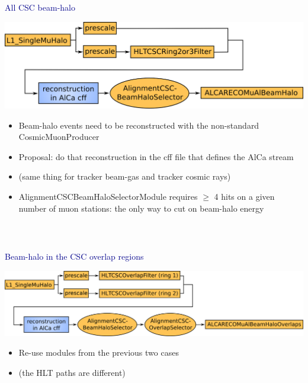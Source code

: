 \documentclass[compress]{beamer}
\begin{document}
\begin{frame}
\frametitle{\mbox{ }}

\vfill
\hspace{-0.83 cm} \textcolor{darkblue}{\Large All CSC beam-halo}

\vspace{0.5 cm}
\includegraphics[height=2.4 cm]{path_beamhalo.png}

\begin{itemize}\setlength{\itemsep}{0.25 cm}
\item Beam-halo events need to be reconstructed with the non-standard CosmicMuonProducer

\item Proposal: do that reconstruction in the cff file that defines the AlCa stream

\item (same thing for tracker beam-gas and tracker cosmic rays)

\item AlignmentCSCBeamHaloSelectorModule requires $\ge$ 4 hits on a
given number of muon stations: the only way to cut on beam-halo energy
\end{itemize}
\end{frame}

\begin{frame}
\frametitle{\mbox{ }}

\hspace{-0.83 cm} \textcolor{darkblue}{\Large Beam-halo in the CSC overlap regions}

\vspace{0.5 cm}
\includegraphics[height=2.4 cm]{path_beamhalo_overlap.png}

\begin{itemize}\setlength{\itemsep}{0.25 cm}
\item Re-use modules from the previous two cases

\item (the HLT paths are different)
\end{itemize}
\end{frame}
\end{document}
